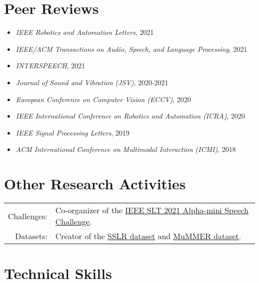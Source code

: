 \documentclass[a4paper,9pt]{extarticle} %
\begin{document}

\section{Peer Reviews}

\begin{itemize}[itemsep=-.9em]
  \item \textit{IEEE Robotics and Automation Letters}, 2021
  \item \textit{IEEE/ACM Transactions on Audio, Speech, and Language Processing}, 2021
  \item \textit{INTERSPEECH}, 2021
  \item \textit{Journal of Sound and Vibration (JSV)}, 2020-2021
  \item \textit{European Conference on Computer Vision (ECCV)}, 2020
  \item \textit{IEEE International Conference on Robotics and Automation (ICRA)}, 2020
  \item \textit{IEEE Signal Processing Letters}, 2019
  \item \textit{ACM International Conference on Multimodal Interaction (ICMI)}, 2018
\end{itemize}


\section{Other Research Activities}

\begin{tabular}{rl}
  Challenges: & Co-organizer of the \href{http://asc.ubtrobot.com/}{IEEE SLT 2021 Alpha-mini Speech Challenge}. \\
  Datasets:   & Creator of the \href{https://www.idiap.ch/dataset/sslr}{SSLR dataset} and \href{https://www.idiap.ch/dataset/mummer}{MuMMER dataset}. \\
\end{tabular}


\section{Technical Skills}
\end{document}
